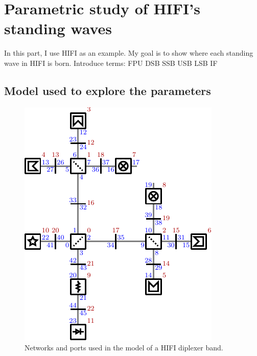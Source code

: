 \cleardoublepage
\chapter{Parametric study of HIFI's standing waves}

In this part, I use HIFI as an example.
My goal is to show where each standing wave in HIFI is born.
Introduce terms:
FPU
DSB
SSB
USB
LSB
IF


\section{Model used to explore the parameters}

\begin{figure}[hbtp]
    \centering
    \includegraphics[width=\textwidth]{ports_diplexerband}
    \caption{Networks and ports used in the model of a HIFI diplexer band.}
    \label{fig:ports_diplexerband}
\end{figure}

